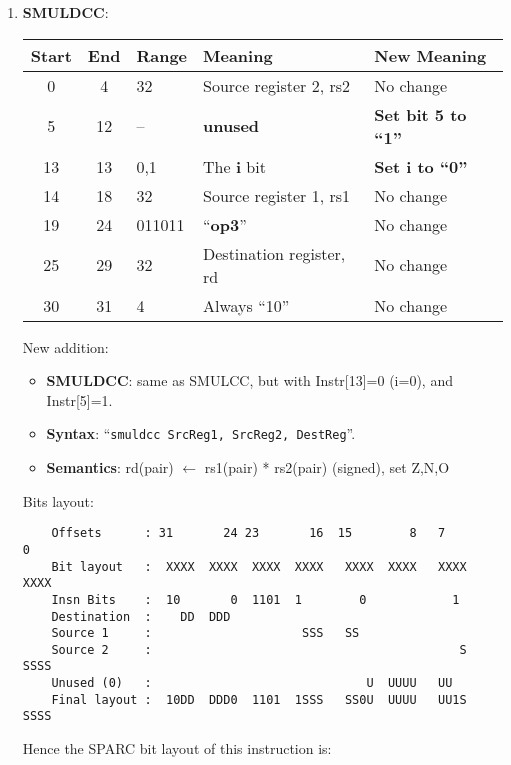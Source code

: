 \begin{enumerate}
\item \textbf{SMULDCC}:\\
  \begin{center}
    \begin{tabular}[p]{|c|c|l|l|l|}
      \hline
      \textbf{Start} & \textbf{End} & \textbf{Range} & \textbf{Meaning} &
                                                                          \textbf{New Meaning}\\
      \hline
      0 & 4 & 32 & Source register 2, rs2 & No change \\
      5 & 12 & -- & \textbf{unused} & \textbf{Set bit 5 to ``1''} \\
      13 & 13 & 0,1 & The \textbf{i} bit & \textbf{Set i to ``0''} \\
      14 & 18 & 32 & Source register 1, rs1 & No change \\
      19 & 24 & 011011 & ``\textbf{op3}'' & No change \\
      25 & 29 & 32 & Destination register, rd & No change \\
      30 & 31 & 4 & Always ``10'' & No change \\
      \hline
    \end{tabular}
  \end{center}
  New addition:
  \begin{itemize}
  \item []\textbf{SMULDCC}: same as SMULCC, but with Instr[13]=0 (i=0), and
    Instr[5]=1.
  \item []\textbf{Syntax}: ``\texttt{smuldcc  SrcReg1, SrcReg2, DestReg}''.
  \item []\textbf{Semantics}: rd(pair) $\leftarrow$ rs1(pair) *
    rs2(pair) (signed), set Z,N,O
  \end{itemize}
  Bits layout:
\begin{verbatim}
    Offsets      : 31       24 23       16  15        8   7        0
    Bit layout   :  XXXX  XXXX  XXXX  XXXX   XXXX  XXXX   XXXX  XXXX
    Insn Bits    :  10       0  1101  1        0            1       
    Destination  :    DD  DDD                                       
    Source 1     :                     SSS   SS
    Source 2     :                                           S  SSSS
    Unused (0)   :                              U  UUUU   UU        
    Final layout :  10DD  DDD0  1101  1SSS   SS0U  UUUU   UU1S  SSSS
\end{verbatim}

  Hence the SPARC bit layout of this instruction is:


\end{enumerate}
